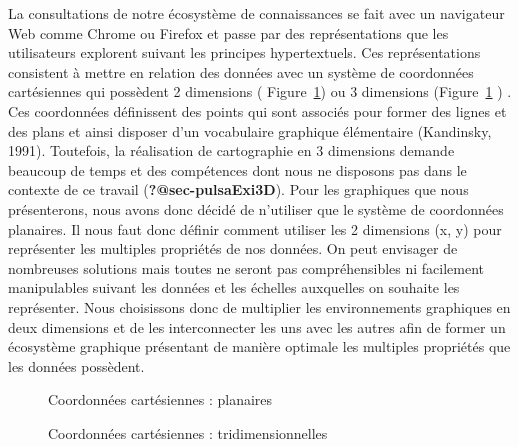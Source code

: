 \documentclass[
  a4paper,
  DIV=11,
  numbers=noendperiod]{scrreprt}
\begin{document}
La consultations de notre écosystème de connaissances se fait avec un
navigateur Web comme Chrome ou Firefox et passe par des représentations
que les utilisateurs explorent suivant les principes hypertextuels. Ces
représentations consistent à mettre en relation des données avec un
système de coordonnées cartésiennes qui possèdent 2 dimensions (
Figure~\ref{fig-coor2D}) ou 3 dimensions (Figure~\ref{fig-coor2D} ) .
Ces coordonnées définissent des points qui sont associés pour former des
lignes et des plans et ainsi disposer d'un vocabulaire graphique
élémentaire (Kandinsky, 1991). Toutefois, la réalisation de cartographie
en 3 dimensions demande beaucoup de temps et des compétences dont nous
ne disposons pas dans le contexte de ce travail
(\textbf{?@sec-pulsaExi3D}). Pour les graphiques que nous présenterons,
nous avons donc décidé de n'utiliser que le système de coordonnées
planaires. Il nous faut donc définir comment utiliser les 2 dimensions
(x, y) pour représenter les multiples propriétés de nos données. On peut
envisager de nombreuses solutions mais toutes ne seront pas
compréhensibles ni facilement manipulables suivant les données et les
échelles auxquelles on souhaite les représenter. Nous choisissons donc
de multiplier les environnements graphiques en deux dimensions et de les
interconnecter les uns avec les autres afin de former un écosystème
graphique présentant de manière optimale les multiples propriétés que
les données possèdent.

\begin{figure}


\caption{\label{fig-coor2D}Coordonnées cartésiennes : planaires}

\end{figure}%

\begin{figure}


\caption{\label{fig-coor3D}Coordonnées cartésiennes :
tridimensionnelles}

\end{figure}%
\end{document}
